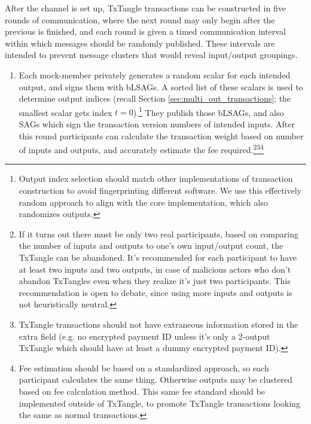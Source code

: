 After the channel is set up, TxTangle transactions can be constructed in five rounds of communication, where the next round may only begin after the previous is finished, and each round is given a timed communication interval within which messages should be randomly published. These intervals are intended to prevent message clusters that would reveal input/output groupings.
\begin{enumerate}
    \item Each mock-member privately generates a random scalar for each intended output, and signs them with bLSAGs. A sorted list of these scalars is used to determine output indices (recall Section \ref{sec:multi_out_transactions}; the smallest scalar gets index $t = 0$).\footnote{Output index selection should match other implementations of transaction construction to avoid fingerprinting different software. We use this effectively random approach to align with the core implementation, which also randomizes outputs.} They publish those bLSAGs, and also SAGs which sign the transaction version numbers of intended inputs. After this round participants can calculate the transaction weight based on number of inputs and outputs, and accurately estimate the fee required.\footnote{If it turns out there must be only two real participants, based on comparing the number of inputs and outputs to one's own input/output count, the TxTangle can be abandoned. It's recommended for each participant to have at least two inputs and two outputs, in case of malicious actors who don't abandon TxTangles even when they realize it's just two participants. This recommendation is open to debate, since using more inputs and outputs is not heuristically neutral.}\footnote{TxTangle transactions should not have extraneous information stored in the extra field (e.g. no encrypted payment ID unless it's only a 2-output TxTangle which should have at least a dummy encrypted payment ID).}\footnote{Fee estimation should be based on a standardized approach, so each participant calculates the same thing. Otherwise outputs may be clustered based on fee calculation method. This same fee standard should be implemented outside of TxTangle, to promote TxTangle transactions looking the same as normal transactions.}

\end{enumerate}
